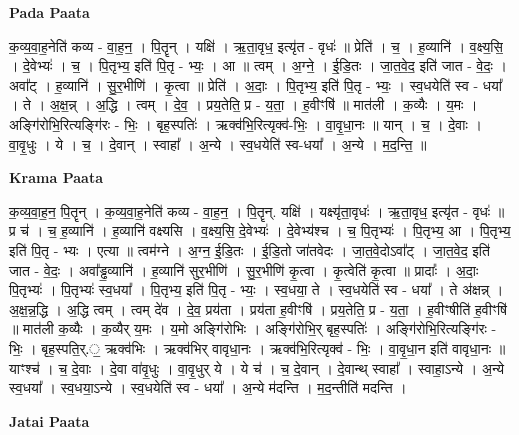 \documentclass[17pt]{extarticle}
\begin{document}
\textbf{Pada Paata} \newline

क॒व्य॒वा॒ह॒नेति॑ कव्य - वा॒ह॒न॒ । पि॒तॄन् । यक्षि॑ । ऋ॒ता॒वृध॒ इत्यृ॑त - वृधः॑ ॥ प्रेति॑ । च॒ । ह॒व्यानि॑ । व॒क्ष्य॒सि॒ । दे॒वेभ्यः॑ । च॒ । पि॒तृभ्य॒ इति॑ पि॒तृ - भ्यः॒ । आ ॥ त्वम् । अ॒ग्ने॒ । ई॒डि॒तः । जा॒त॒वे॒द॒ इति॑ जात - वे॒दः॒ । अवा᳚ट् । ह॒व्यानि॑ । सु॒र॒भीणि॑ । कृ॒त्वा ॥ प्रेति॑ । अ॒दाः॒ । पि॒तृभ्य॒ इति॑ पि॒तृ - भ्यः॒ । स्व॒धयेति॑ स्व - धया᳚ । ते । अ॒क्ष॒न्न् । अ॒द्धि । त्वम् । दे॒व॒ । प्रय॒तेति॒ प्र - य॒ता॒ । ह॒वीꣳषि॑ ॥ मात॑ली । क॒व्यैः । य॒मः । अङ्गि॑रोभि॒रित्यङ्गि॑रः - भिः॒ । बृह॒स्पतिः॑ । ऋक्व॑भि॒रित्यृक्व॑-भिः॒ । वा॒वृ॒धा॒नः ॥ यान् । च॒ । दे॒वाः । वा॒वृ॒धुः । ये । च॒ । दे॒वान् । स्वाहा᳚ । अ॒न्ये । स्व॒धयेति॑ स्व-धया᳚ । अ॒न्ये । म॒द॒न्ति॒ ॥  \newline


\textbf{Krama Paata} \newline

क॒व्य॒वा॒ह॒न॒ पि॒तॄन् । क॒व्य॒वा॒ह॒नेति॑ कव्य - वा॒ह॒न॒ । पि॒तॄन्. यक्षि॑ । यक्ष्यृ॑ता॒वृधः॑ । ऋ॒ता॒वृध॒ इत्यृ॑त - वृधः॑ ॥ प्र च॑ । च॒ ह॒व्यानि॑ । ह॒व्यानि॑ वक्ष्यसि । व॒क्ष्य॒सि॒ दे॒वेभ्यः॑ । दे॒वेभ्य॑श्च । च॒ पि॒तृभ्यः॑ । पि॒तृभ्य॒ आ । पि॒तृभ्य॒ इति॑ पि॒तृ - भ्यः । एत्या ॥ त्वम॑ग्ने । अ॒ग्न॒ ई॒डि॒तः । ई॒डि॒तो जा॑तवेदः । जा॒त॒वे॒दोऽवा᳚ट् । जा॒त॒वे॒द॒ इति॑ जात - वे॒दः॒ । अवा᳚ड्ढ॒व्यानि॑ । ह॒व्यानि॑ सुर॒भीणि॑ । सु॒र॒भीणि॑ कृ॒त्वा । कृ॒त्वेति॑ कृ॒त्वा ॥ प्रादाः᳚ । अ॒दाः॒ पि॒तृभ्यः॑ । पि॒तृभ्यः॑ स्व॒धया᳚ । पि॒तृभ्य॒ इति॑ पि॒तृ - भ्यः॒ । स्व॒धया॒ ते । स्व॒धयेति॑ स्व - धया᳚ । ते अ॑क्षन्न् । अ॒क्ष॒न्न॒द्धि । अ॒द्धि त्वम् । त्वम् दे॑व । दे॒व॒ प्रय॑ता । प्रय॑ता ह॒वीꣳषि॑ । प्रय॒तेति॒ प्र - य॒ता॒ । ह॒वीꣳषीति॑ ह॒वीꣳषि॑ ॥ मात॑ली क॒व्यैः । क॒व्यैर् य॒मः । य॒मो अङ्गि॑रोभिः । अङ्गि॑रोभि॒र् बृह॒स्पतिः॑ । अङ्गि॑रोभि॒रित्यङ्गि॑रः - भिः॒ । बृह॒स्पति॒र्.॒ ऋक्व॑भिः । ऋक्व॑भिर् वावृधा॒नः । ऋक्व॑भि॒रित्यृक्व॑ - भिः॒ । वा॒वृ॒धा॒न इति॑ वावृधा॒नः ॥ याꣳश्च॑ । च॒ दे॒वाः । दे॒वा वा॑वृ॒धुः । वा॒वृ॒धुर् ये । ये च॑ । च॒ दे॒वान् । दे॒वान्थ् स्वाहा᳚ । स्वाहा॒ऽन्ये । अ॒न्ये स्व॒धया᳚ । स्व॒धया॒ऽन्ये । स्व॒धयेति॑ स्व - धया᳚ । अ॒न्ये म॑दन्ति । म॒द॒न्तीति॑ मदन्ति । \newline

\textbf{Jatai Paata} \newline
\end{document}
